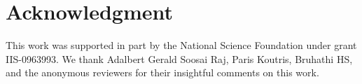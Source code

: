 \section{Acknowledgment}
This work was supported in part by the National Science Foundation under grant IIS-0963993. 
We thank Adalbert Gerald Soosai Raj, Paris Koutris, Bruhathi HS, and the anonymous reviewers for their insightful comments on this work.